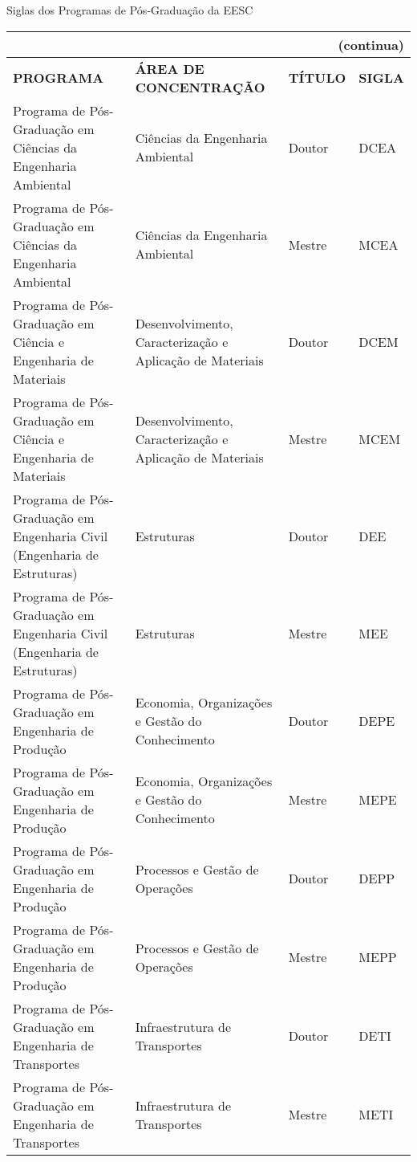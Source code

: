 \begin{apendicesenv}
\begin{quadro}[htb]
\ABNTEXfontereduzida
\caption[Siglas dos Programas de Pós-Graduação da EESC]{Siglas dos Programas de Pós-Graduação da EESC} 
\label{quadro-eesc}
\begin{tabular}{|p{6.0cm}|p{4.5cm}|p{2.0cm}|p{1.75cm}|}
\multicolumn{4}{r}{{(continua)}} \\ 
  \hline
   \textbf{PROGRAMA} & \textbf{ÁREA DE CONCENTRAÇÃO} & \textbf{TÍTULO} & \textbf{SIGLA}  \\
    \hline
Programa de Pós-Graduação em Ciências da Engenharia Ambiental & Ciências da Engenharia Ambiental & Doutor & DCEA \\
Programa de Pós-Graduação em Ciências da Engenharia Ambiental & Ciências da Engenharia Ambiental & Mestre & MCEA \\
Programa de Pós-Graduação em Ciência e Engenharia de Materiais & Desenvolvimento, Caracterização e Aplicação de Materiais  & Doutor & DCEM \\
Programa de Pós-Graduação em Ciência e Engenharia de Materiais & Desenvolvimento, Caracterização e Aplicação de Materiais & Mestre & MCEM \\
Programa de Pós-Graduação em Engenharia Civil (Engenharia de Estruturas) & Estruturas & Doutor & DEE \\
Programa de Pós-Graduação em Engenharia Civil (Engenharia de Estruturas) & Estruturas & Mestre & MEE \\
Programa de Pós-Graduação em Engenharia de Produção & Economia, Organizações e Gestão do Conhecimento & Doutor & DEPE \\
Programa de Pós-Graduação em Engenharia de Produção & Economia, Organizações e Gestão do Conhecimento & Mestre & MEPE \\
Programa de Pós-Graduação em Engenharia de Produção & Processos e Gestão de Operações & Doutor & DEPP \\
Programa de Pós-Graduação em Engenharia de Produção & Processos e Gestão de Operações & Mestre & MEPP \\
Programa de Pós-Graduação em Engenharia de Transportes & Infraestrutura de Transportes & Doutor & DETI \\
Programa de Pós-Graduação em Engenharia de Transportes & Infraestrutura de Transportes & Mestre & METI \\

\end{tabular}
\end{quadro}
\end{apendicesenv}
